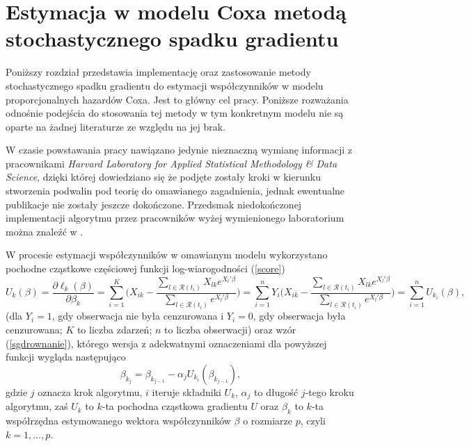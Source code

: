 \chapter{Estymacja w modelu Coxa metodą stochastycznego spadku gradientu}

Poniższy rozdział przedstawia implementację oraz zastosowanie metody stochastycznego spadku gradientu do estymacji współczynników w modelu proporcjonalnych hazardów Coxa. Jest to główny cel pracy. Poniższe rozważania odnośnie podejścia do stosowania tej metody w tym konkretnym modelu nie są oparte na żadnej literaturze ze względu na jej brak.

W czasie powstawania pracy nawiązano jedynie nieznaczną wymianę informacji z pracownikami \textit{Harvard Laboratory for Applied Statistical Methodology \& Data Science}, dzięki której dowiedziano się że podjęte zostały kroki w kierunku stworzenia podwalin pod teorię do omawianego zagadnienia, jednak ewentualne publikacje nie zostały jeszcze dokończone. Przedsmak niedokończonej implementacji algorytmu przez pracowników wyżej wymienionego laboratorium można znaleźć w \cite{sgdpkg}.

W procesie estymacji współczynników w omawianym modelu wykorzystano pochodne cząstkowe częściowej funkcji log-wiarogodności (\ref{score})
\begin{equation*}
U_k(\beta)=\dfrac{\partial\ell_k(\beta)}{\partial\beta_k}=\sum\limits_{i=1}^{K}\Big(X_{ik}-\dfrac{\sum\limits_{l\in \mathscr{R}(t_i)}^{} X_{lk} e^{X_l'\beta}}{\sum\limits_{l\in \mathscr{R}(t_i)}^{} e^{X_l'\beta}}\Big)=\sum\limits_{i=1}^{n}Y_i\Big(X_{ik}-\dfrac{\sum\limits_{l\in \mathscr{R}(t_i)}^{} X_{lk} e^{X_l'\beta}}{\sum\limits_{l\in \mathscr{R}(t_i)}^{} e^{X_l'\beta}}\Big)=\sum\limits_{i=1}^{n}U_{k_{i}}(\beta),
\end{equation*}
(dla $Y_i = 1$, gdy obserwacja nie była cenzurowana i $Y_i = 0$, gdy obserwacja była cenzurowana; $K$ to liczba zdarzeń; $n$ to liczba obserwacji) oraz wzór (\ref{sgdrownanie}), którego wersja z adekwatnymi oznaczeniami dla powyższej funkcji wygląda następująco
\begin{equation}
\beta_{k_{j}} = \beta_{k_{j-1}} - \alpha_{j}U_{k_{i}}(\beta_{k_{j-1}}),
\end{equation}
gdzie $j$ oznacza krok algorytmu, $i$ iteruje składniki $U_{k}$, $\alpha_j$ to długość $j$-tego kroku algorytmu, zaś $U_{k}$ to $k$-ta pochodna cząstkowa gradientu $U$ oraz $\beta_{k}$ to $k$-ta współrzędna estymowanego wektora współczynników $\beta$ o rozmiarze $p$, czyli $k=1,\dots,p$. 

